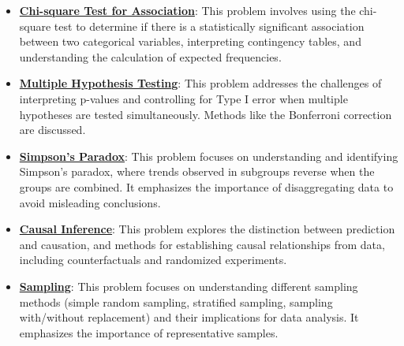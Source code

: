 \documentclass{article}%
\begin{document}
\begin{itemize}[leftmargin=*]
\item \href{https://purdue.brightspace.com/d2l/common/assets/pdfjs-d2l-dist/1.0.14-legacy/web/viewer.html?file=\%2Fcontent\%2Fenforced\%2F1095465-WL.202510.CS24200.LE1\%2F15L2-AB-testing.pdf\%3Fou\%3D1095465\&lang=en-us\&container=d2l-fileviewer-rendered-pdf\&fullscreen=d2l-fileviewer-rendered-pdf-dialog\&height=667#page=18}{\textbf{Chi{-}square Test for Association}}: This problem involves using the chi-square test to determine if there is a statistically significant association between two categorical variables, interpreting contingency tables, and understanding the calculation of expected frequencies.%
\item \href{https://purdue.brightspace.com/d2l/common/assets/pdfjs-d2l-dist/1.0.14-legacy/web/viewer.html?file=\%2Fcontent\%2Fenforced\%2F1095465-WL.202510.CS24200.LE1\%2F15L2-AB-testing.pdf\%3Fou\%3D1095465\&lang=en-us\&container=d2l-fileviewer-rendered-pdf\&fullscreen=d2l-fileviewer-rendered-pdf-dialog\&height=667#page=26}{\textbf{Multiple Hypothesis Testing}}: This problem addresses the challenges of interpreting p-values and controlling for Type I error when multiple hypotheses are tested simultaneously. Methods like the Bonferroni correction are discussed.%
\item \href{https://purdue.brightspace.com/d2l/common/assets/pdfjs-d2l-dist/1.0.14-legacy/web/viewer.html?file=\%2Fcontent\%2Fenforced\%2F1095465-WL.202510.CS24200.LE1\%2F15L2-AB-testing.pdf\%3Fou\%3D1095465\&lang=en-us\&container=d2l-fileviewer-rendered-pdf\&fullscreen=d2l-fileviewer-rendered-pdf-dialog\&height=667#page=41}{\textbf{Simpson's Paradox}}: This problem focuses on understanding and identifying Simpson's paradox, where trends observed in subgroups reverse when the groups are combined. It emphasizes the importance of disaggregating data to avoid misleading conclusions.%
\item \href{https://purdue.brightspace.com/d2l/common/assets/pdfjs-d2l-dist/1.0.14-legacy/web/viewer.html?file=\%2Fcontent\%2Fenforced\%2F1095465-WL.202510.CS24200.LE1\%2F15L2-AB-testing.pdf\%3Fou\%3D1095465\&lang=en-us\&container=d2l-fileviewer-rendered-pdf\&fullscreen=d2l-fileviewer-rendered-pdf-dialog\&height=667#page=44}{\textbf{Causal Inference}}: This problem explores the distinction between prediction and causation, and methods for establishing causal relationships from data, including counterfactuals and randomized experiments.%
\item \href{https://purdue.brightspace.com/d2l/common/assets/pdfjs-d2l-dist/1.0.14-legacy/web/viewer.html?file=\%2Fcontent\%2Fenforced\%2F1095465-WL.202510.CS24200.LE1\%2F15L2-AB-testing.pdf\%3Fou\%3D1095465\&lang=en-us\&container=d2l-fileviewer-rendered-pdf\&fullscreen=d2l-fileviewer-rendered-pdf-dialog\&height=667#page=36}{\textbf{Sampling}}: This problem focuses on understanding different sampling methods (simple random sampling, stratified sampling, sampling with/without replacement) and their implications for data analysis. It emphasizes the importance of representative samples.%
\end{itemize}%
\end{document}
